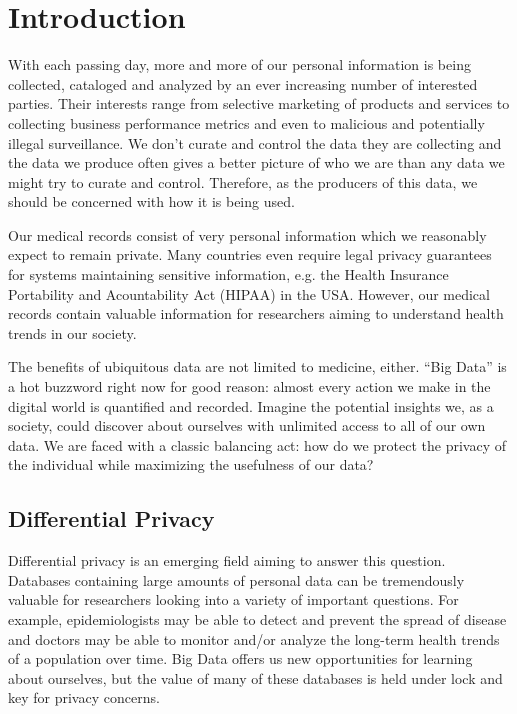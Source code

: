 \documentclass[12pt]{report}
\begin{document}
\clearpage
\tableofcontents
\clearpage
\listoffigures
\clearpage

\chapter{Introduction}\label{sec:introduction}

With each passing day, more and more of our personal information is being collected, cataloged and analyzed by an ever increasing number of interested parties.
Their interests range from selective marketing of products and services to collecting business performance metrics and even to malicious and potentially illegal surveillance.
We don't curate and control the data they are collecting and the data we produce often gives a better picture of who we are than any data we might try to curate and control.
Therefore, as the producers of this data, we should be concerned with how it is being used.

Our medical records consist of very personal information which we reasonably expect to remain private.
Many countries even require legal privacy guarantees for systems maintaining sensitive information, e.g. the Health Insurance Portability and Acountability Act (HIPAA) in the USA.
However, our medical records contain valuable information for researchers aiming to understand health trends in our society.

The benefits of ubiquitous data are not limited to medicine, either.
``Big Data'' is a hot buzzword right now for good reason: almost every action we make in the digital world is quantified and recorded.
Imagine the potential insights we, as a society, could discover about ourselves with unlimited access to all of our own data.
We are faced with a classic balancing act: how do we protect the privacy of the individual while maximizing the usefulness of our data?

\section{Differential Privacy}\label{sec:intro-diffpriv}

Differential privacy is an emerging field aiming to answer this question\cite{journals/cacm/Dwork11}.
Databases containing large amounts of personal data can be tremendously valuable for researchers looking into a variety of important questions.
For example, epidemiologists may be able to detect and prevent the spread of disease and doctors may be able to monitor and/or analyze the long-term health trends of a population over time.
Big Data offers us new opportunities for learning about ourselves, but the value of many of these databases is held under lock and key for privacy concerns.
\end{document}
